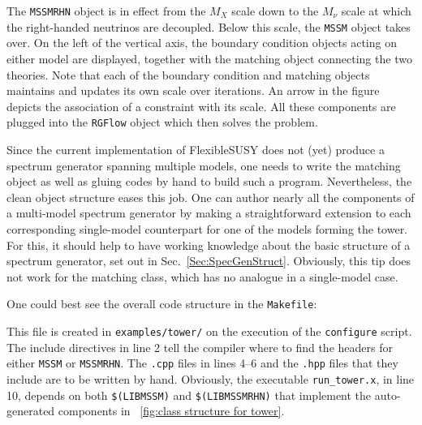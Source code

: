 \documentclass[final,3p,11pt,pdflatex]{elsarticle}
\makeatletter
\newcommand{\fs}{FlexibleSUSY\@\xspace}
\newcommand{\code}[1]{\lstinline|#1|}  %
\newcommand{\figref}[1]{\figurename~\ref{#1}}
\newcommand{\secref}[1]{Sec.~\ref{#1}}
\makeatother
\begin{document}
The \code{MSSMRHN} object is in effect from the $M_X$ scale down to
the $M_\nu$ scale at which the right-handed neutrinos are decoupled.
Below this scale, the \code{MSSM} object takes over.
On the left of the vertical axis,
the boundary condition objects acting on either model are displayed,
together with the matching object connecting the two theories.
Note that each of the boundary condition and matching objects
maintains and updates its own scale over iterations.
An arrow in the figure depicts
the association of a constraint with its scale.
All these components are plugged into the \code{RGFlow} object
which then solves the problem.

Since the current implementation of \fs does not (yet)
produce a spectrum generator spanning multiple models,
one needs to write the matching object
as well as gluing codes by hand to build such a program.
Nevertheless, the clean object structure eases this job.
One can author nearly all the components of a multi-model spectrum generator
by making a straightforward extension
to each corresponding single-model counterpart
for one of the models forming the tower.
For this, it should help to have working knowledge about the basic structure
of a spectrum generator, set out in \secref{Sec:SpecGenStruct}.
Obviously, this tip does not work for the matching class,
which has no analogue in a single-model case.

One could best see the overall code structure in the \code{Makefile}:
This file is created in \code{examples/tower/}
on the execution of the \code{configure} script.
The include directives in line 2 tell the compiler
where to find the headers for either \code{MSSM} or \code{MSSMRHN}.
The \code{.cpp} files in lines 4--6 and the \code{.hpp} files
that they include are to be written by hand.
Obviously, the executable \code{run_tower.x}, in line 10, depends on both
\code{$(LIBMSSM)} and \code{$(LIBMSSMRHN)}
that implement the auto-generated
components in \figref{fig:class structure for tower}.
\end{document}
